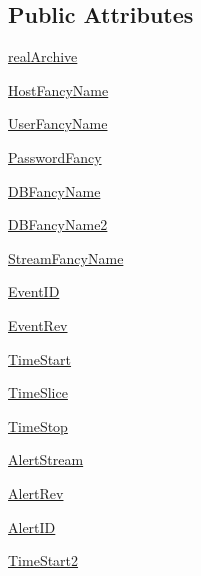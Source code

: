 \subsection*{Public Attributes}
\begin{DoxyCompactItemize}
\item 
\hyperlink{classamonpy_1_1dbase_1_1test_1_1test__db__read_1_1_test_d_b_read_a6700613b2e7f2b5a5f84f8fa3b8e8e3f}{real\-Archive}
\item 
\hyperlink{classamonpy_1_1dbase_1_1test_1_1test__db__read_1_1_test_d_b_read_aef02f233501a4c3d5f1b005a1c0c0d72}{Host\-Fancy\-Name}
\item 
\hyperlink{classamonpy_1_1dbase_1_1test_1_1test__db__read_1_1_test_d_b_read_a9ed55e19e8187469a496695884509101}{User\-Fancy\-Name}
\item 
\hyperlink{classamonpy_1_1dbase_1_1test_1_1test__db__read_1_1_test_d_b_read_af3fe3e1b6f4d40624da8b3168058e355}{Password\-Fancy}
\item 
\hyperlink{classamonpy_1_1dbase_1_1test_1_1test__db__read_1_1_test_d_b_read_af7baa96afc495b6ddf3b2a9c053e6273}{D\-B\-Fancy\-Name}
\item 
\hyperlink{classamonpy_1_1dbase_1_1test_1_1test__db__read_1_1_test_d_b_read_a4ec0f5238616b6faf18b5754b8f708d4}{D\-B\-Fancy\-Name2}
\item 
\hyperlink{classamonpy_1_1dbase_1_1test_1_1test__db__read_1_1_test_d_b_read_ac7f82aeb05869690ebcd4c7619117943}{Stream\-Fancy\-Name}
\item 
\hyperlink{classamonpy_1_1dbase_1_1test_1_1test__db__read_1_1_test_d_b_read_aab94ea32aa54e6d2cca5f68e1387be51}{Event\-I\-D}
\item 
\hyperlink{classamonpy_1_1dbase_1_1test_1_1test__db__read_1_1_test_d_b_read_a6f44b33da586a4e0dfba810ab1692852}{Event\-Rev}
\item 
\hyperlink{classamonpy_1_1dbase_1_1test_1_1test__db__read_1_1_test_d_b_read_aec46e79a01fcb17284df6e0ccf8af8fc}{Time\-Start}
\item 
\hyperlink{classamonpy_1_1dbase_1_1test_1_1test__db__read_1_1_test_d_b_read_aa69e0701a1ef6f93dc6053a6cad634dd}{Time\-Slice}
\item 
\hyperlink{classamonpy_1_1dbase_1_1test_1_1test__db__read_1_1_test_d_b_read_a3ee527a724daeb372b8fe60472ba5ce4}{Time\-Stop}
\item 
\hyperlink{classamonpy_1_1dbase_1_1test_1_1test__db__read_1_1_test_d_b_read_a762f69bcd3574f95324c3874f7712b6b}{Alert\-Stream}
\item 
\hyperlink{classamonpy_1_1dbase_1_1test_1_1test__db__read_1_1_test_d_b_read_ab8058162f86c23241a86b9c23671aa26}{Alert\-Rev}
\item 
\hyperlink{classamonpy_1_1dbase_1_1test_1_1test__db__read_1_1_test_d_b_read_adc41ecfc3c76fdd34341069786072911}{Alert\-I\-D}
\item 
\hyperlink{classamonpy_1_1dbase_1_1test_1_1test__db__read_1_1_test_d_b_read_ae601f95c55daa72d31a753475e4aa7f5}{Time\-Start2}
\end{DoxyCompactItemize}


